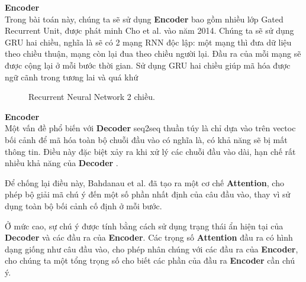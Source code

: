 \large\textbf{Encoder} \\[0.2em]
 Trong bài toán này, chúng ta sẽ sử dụng \textbf{Encoder} bao gồm nhiều lớp Gated Recurrent Unit, được phát minh Cho et
al. vào năm 2014. Chúng ta sẽ sử dụng GRU hai chiều, nghĩa là sẽ có 2 mạng RNN độc lập: một mạng thì đưa dữ liệu theo
chiều thuận, mạng còn lại đua theo chiều người lại. Đầu ra của mỗi mạng sẽ được cộng lại ở mỗi bước thời gian. Sử
dụng GRU hai chiều giúp mã hóa được ngữ cãnh trong tương lai và quá khứ
\begin{figure}[!htb]
    \caption{\label{fig:rnn-rolled} Recurrent Neural Network 2 chiều.}
\end{figure}

\large\textbf{Encoder} \\[0.2em]
Một vấn đề phổ biến với \textbf{Decoder} seq2seq thuần túy là chỉ dựa vào trên vectoc bối cảnh để mã hóa
toàn bộ chuỗi đầu vào có nghĩa là, có khả năng sẽ bị mất thông tin. Điều này đặc biệt xảy ra khi xử lý các chuỗi đầu
vào dài, hạn chế rất nhiều khả năng của \textbf{Decoder} .

Để chống lại điều này, Bahdanau et al. đã tạo ra một cơ chế \textbf{Attention}, cho phép bộ giải mã chú ý đến một số
phần nhất định của câu đầu vào, thay vì sử dụng toàn bộ bối cảnh cố định ở mỗi bước.

Ở mức cao, sự chú ý được tính bằng cách sử dụng trạng thái ẩn hiện tại của \textbf{Decoder} và các đầu ra của
\textbf{Encoder}. Các trọng số \textbf{Attention} đầu ra có hình dạng giống như câu đầu vào, cho phép nhân
chúng với các đầu ra của \textbf{Encoder}, cho chúng ta một tổng trọng số cho biết các phần của đầu ra
\textbf{Encoder} cần chú ý.
\begin{figure}[!htb]
\end{figure}

